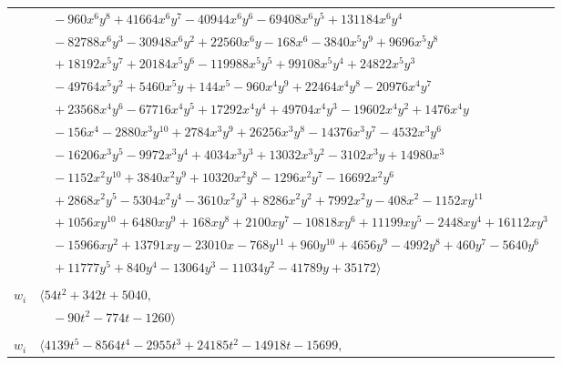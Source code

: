 \documentclass[11pt]{article}
\begin{document}
\begin{longtable}{@{}ll@{}}
 & $\quad -960x^{6}y^{8}+41664x^{6}y^{7}-40944x^{6}y^{6}-69408x^{6}y^{5}+131184x^{6}y^{4}$\\
 & $\quad -82788x^{6}y^{3}-30948x^{6}y^{2}+22560x^{6}y-168x^{6}-3840x^{5}y^{9}+9696x^{5}y^{8}$\\
 & $\quad +18192x^{5}y^{7}+20184x^{5}y^{6}-119988x^{5}y^{5}+99108x^{5}y^{4}+24822x^{5}y^{3}$\\
 & $\quad -49764x^{5}y^{2}+5460x^{5}y+144x^{5}-960x^{4}y^{9}+22464x^{4}y^{8}-20976x^{4}y^{7}$\\
 & $\quad +23568x^{4}y^{6}-67716x^{4}y^{5}+17292x^{4}y^{4}+49704x^{4}y^{3}-19602x^{4}y^{2}+1476x^{4}y$\\
 & $\quad -156x^{4}-2880x^{3}y^{10}+2784x^{3}y^{9}+26256x^{3}y^{8}-14376x^{3}y^{7}-4532x^{3}y^{6}$\\
 & $\quad -16206x^{3}y^{5}-9972x^{3}y^{4}+4034x^{3}y^{3}+13032x^{3}y^{2}-3102x^{3}y+14980x^{3}$\\
 & $\quad -1152x^{2}y^{10}+3840x^{2}y^{9}+10320x^{2}y^{8}-1296x^{2}y^{7}-16692x^{2}y^{6}$\\
 & $\quad +2868x^{2}y^{5}-5304x^{2}y^{4}-3610x^{2}y^{3}+8286x^{2}y^{2}+7992x^{2}y-408x^{2}-1152xy^{11}$\\
 & $\quad +1056xy^{10}+6480xy^{9}+168xy^{8}+2100xy^{7}-10818xy^{6}+11199xy^{5}-2448xy^{4}+16112xy^{3}$\\
 & $\quad -15966xy^{2}+13791xy-23010x-768y^{11}+960y^{10}+4656y^{9}-4992y^{8}+460y^{7}-5640y^{6}$\\
 & $\quad +11777y^{5}+840y^{4}-13064y^{3}-11034y^{2}-41789y+35172\rangle$\\
\addlinespace[2pt]
\multicolumn{2}{@{}p{0.97\textwidth}@{}}{$i=33$, $D_i=1$, $\varphi_i=1$, $\rho_{ij}$: $0{:}2, \allowbreak 8{:}2, \allowbreak 9{:}2, \allowbreak 14{:}3, \allowbreak 20{:}3, \allowbreak 28{:}2, \allowbreak 29{:}3, \allowbreak 34{:}2, \allowbreak 35{:}3, \allowbreak 36{:}2, \allowbreak 41{:}2, \allowbreak 44{:}1$}\\
$w_i$ & $\langle 54t^{2}+342t+5040,$\\
 & $\quad -90t^{2}-774t-1260\rangle$\\
\addlinespace[2pt]
\multicolumn{2}{@{}p{0.97\textwidth}@{}}{$i=34$, $D_i=2050$, $\varphi_i=\tau(\Pi_{44})$, $\rho_{ij}$: $1{:}2, \allowbreak 4{:}3, \allowbreak 5{:}2, \allowbreak 6{:}1, \allowbreak 9{:}3, \allowbreak 14{:}2, \allowbreak 21{:}1, \allowbreak 26{:}3, \allowbreak 29{:}3, \allowbreak 33{:}2, \allowbreak 36{:}3, \allowbreak 37{:}3, \allowbreak 45{:}1$}\\
$w_i$ & $\langle 4139t^{5}-8564t^{4}-2955t^{3}+24185t^{2}-14918t-15699,$\\

\end{longtable}
\end{document}
